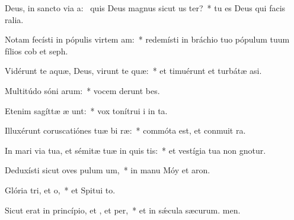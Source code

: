 \item Deus, in sancto via a:~\pscross{} quis Deus magnus sicut us ter?~* tu es Deus qui facis ralia.
\item Notam fecísti in pópulis virtem am:~* redemísti in bráchio tuo pópulum tuum fílios cob et seph.
\item Vidérunt te aquæ, Deus, virunt te quæ:~* et timuérunt et turbátæ  asi.
\item Multitúdo sóni arum:~* vocem derunt bes.
\item Etenim sagíttæ æ unt:~* vox tonítrui i in ta.
\item Illuxérunt coruscatiónes tuæ bi ræ:~* commóta est, et conmuit ra.
\item In mari via tua, et sémitæ tuæ in quis tis:~* et vestígia tua non gnotur.
\item Deduxísti sicut oves pulum um,~* in manu Móy et aron.
\item Glória tri, et o,~* et Spitui to.
\item Sicut erat in princípio, et , et per,~* et in sǽcula sæcurum. men.
